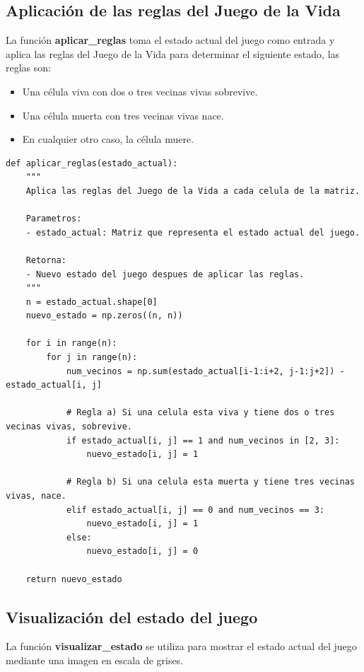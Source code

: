 \begin{enumerate}
\subsection{Aplicación de las reglas del Juego de la Vida}

La función \textbf{aplicar\_reglas} toma el estado actual del juego como entrada y aplica las reglas del Juego de la Vida para determinar el siguiente estado, las reglas son:
\begin{itemize}
    \item Una célula viva con dos o tres vecinas vivas sobrevive.
    \item Una célula muerta con tres vecinas vivas nace.
    \item En cualquier otro caso, la célula muere.
\end{itemize}

\begin{lstlisting}
def aplicar_reglas(estado_actual):
    """
    Aplica las reglas del Juego de la Vida a cada celula de la matriz.
    
    Parametros:
    - estado_actual: Matriz que representa el estado actual del juego.
    
    Retorna:
    - Nuevo estado del juego despues de aplicar las reglas.
    """
    n = estado_actual.shape[0]
    nuevo_estado = np.zeros((n, n))
    
    for i in range(n):
        for j in range(n):
            num_vecinos = np.sum(estado_actual[i-1:i+2, j-1:j+2]) - estado_actual[i, j]
            
            # Regla a) Si una celula esta viva y tiene dos o tres vecinas vivas, sobrevive.
            if estado_actual[i, j] == 1 and num_vecinos in [2, 3]:
                nuevo_estado[i, j] = 1
                        
            # Regla b) Si una celula esta muerta y tiene tres vecinas vivas, nace.
            elif estado_actual[i, j] == 0 and num_vecinos == 3:
                nuevo_estado[i, j] = 1
            else:
                nuevo_estado[i, j] = 0
    
    return nuevo_estado
\end{lstlisting}

\subsection{Visualización del estado del juego}

La función \textbf{visualizar\_estado} se utiliza para mostrar el estado actual del juego mediante una imagen en escala de grises.


\end{enumerate}
